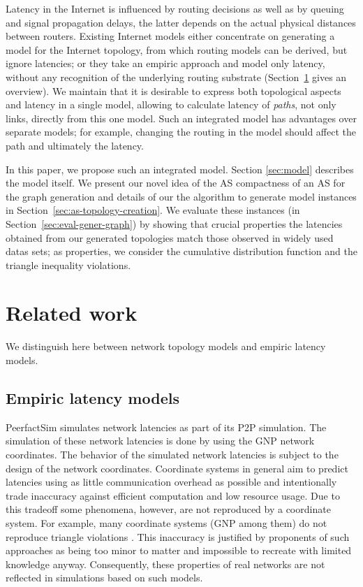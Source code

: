 \documentclass{sig-alternate-10pt}
\begin{document}
Latency in the Internet is influenced by routing decisions as well as
by queuing and signal propagation delays,                                                             the latter depends on the
actual physical distances between routers. Existing Internet models
either concentrate on generating a model for the Internet topology,
from which routing models can be derived, but ignore latencies; or
they take an empiric approach and model only latency, without any
recognition of the underlying routing substrate
(Section~\ref{sec:related-work} gives an overview). We maintain that
it is desirable to express both topological aspects and latency in a
single model, allowing to calculate latency of \emph{paths}, not only
links, directly from this one model. Such an integrated model has
advantages over separate models; for example, changing the routing in
the model should affect the path and ultimately the latency. 

In this paper, we propose such an integrated model.  Section \ref{sec:model}
describes the model itself. We present our novel idea of the AS compactness of an AS for the graph
generation and details of our the algorithm to generate model
instances in Section~\ref{sec:as-topology-creation}. 
We evaluate these instances (in
Section~\ref{sec:eval-gener-graph}) by showing that crucial
properties the latencies obtained from our generated topologies match
those observed in widely used datas sets; as properties, we consider
the cumulative distribution function and the triangle inequality
violations.









\section{Related work}
\label{sec:related-work}

We distinguish here between network topology models and empiric
latency models. 


\subsection{Empiric latency models}
\label{sec:empir-latency-models}


PeerfactSim \cite{pearfactsim} simulates network latencies as part of its P2P simulation. The simulation of these network latencies is done by using the GNP \cite{Ng2002a} network coordinates. The behavior of the simulated network latencies is subject to the design of the network coordinates. 
Coordinate systems in general aim to predict latencies using as little communication overhead as possible and intentionally trade inaccuracy against efficient computation and low resource usage. Due to this tradeoff some phenomena, however, are not reproduced by a coordinate system. For example, many coordinate systems (GNP among them) do not reproduce triangle violations \cite{Donnet2010}. 
This inaccuracy is justified by proponents of such approaches as being too minor to matter and impossible to recreate with limited knowledge anyway. Consequently, these properties of real networks are not reflected in simulations based on such models. 
\end{document}
